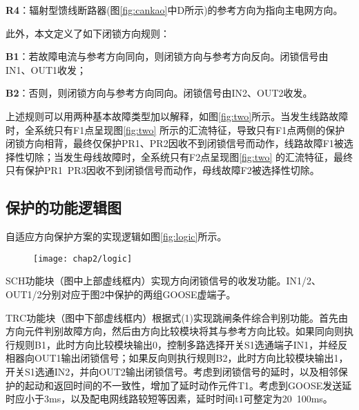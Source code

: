 \textbf{R4}：辐射型馈线断路器(图\ref{fig:cankao}中D所示)的参考方向为指向主电网方向。

此外，本文定义了如下闭锁方向规则：

\textbf{B1}：若故障电流与参考方向同向，则闭锁方向与参考方向反向。闭锁信号由IN1、OUT1收发；

\textbf{B2}：否则，则闭锁方向与参考方向同向。闭锁信号由IN2、OUT2收发。

上述规则可以用两种基本故障类型加以解释，如图\ref{fig:two}所示。当发生线路故障时，全系统只有F1点呈现图\ref{fig:two} 所示的汇流特征，导致只有F1点两侧的保护闭锁方向相背，最终仅保护PR1、PR2因收不到闭锁信号而动作，线路故障F1被选择性切除；当发生母线故障时，全系统只有F2点呈现图\ref{fig:two} 的汇流特征，最终只有保护PR1~PR3因收不到闭锁信号而动作，母线故障F2被选择性切除。

\begin{figure}
    \centering
    \hspace{1in}
\end{figure}


\subsection{保护的功能逻辑图}

自适应方向保护方案的实现逻辑如图\ref{fig:logic}所示。

\begin{figure}[!htp]
  \centering
  \texttt{[image: chap2/logic]}
\end{figure}

SCH功能块（图中上部虚线框内）实现方向闭锁信号的收发功能。IN1/2、OUT1/2分别对应于图2中保护的两组GOOSE虚端子。

TRC功能块（图中下部虚线框内）根据式(1)实现跳闸条件综合判别功能。首先由方向元件判别故障方向，然后由方向比较模块将其与参考方向比较。如果同向则执行规则B1，此时方向比较模块输出0，控制多路选择开关S1选通端子IN1，并经反相器向OUT1输出闭锁信号；如果反向则执行规则B2，此时方向比较模块输出1，开关S1选通IN2，并向OUT2输出闭锁信号。考虑到闭锁信号的延时，以及相邻保护的起动和返回时间的不一致性，增加了延时动作元件T1。考虑到GOOSE发送延时应小于3ms\cite{baigent2004iec}，以及配电网线路较短等因素，延时时间t1可整定为20~100ms。

